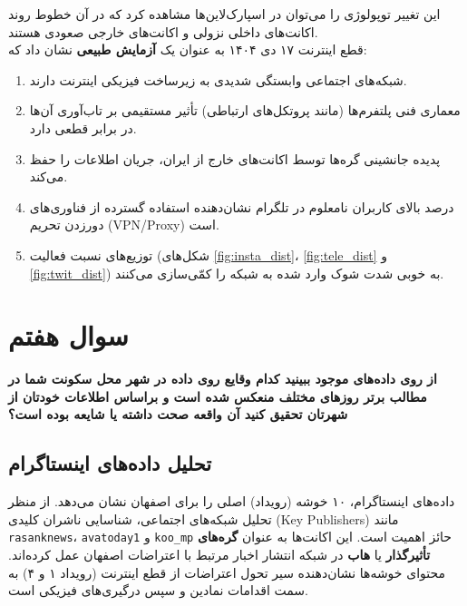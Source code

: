 \documentclass{article}
\begin{document}
		این تغییر توپولوژی را می‌توان در اسپارک‌لاین‌ها مشاهده کرد که در آن خطوط روند اکانت‌های داخلی نزولی و اکانت‌های خارجی صعودی هستند.
		\\
		قطع اینترنت ۱۷ دی ۱۴۰۴ به عنوان یک \textbf{آزمایش طبیعی} نشان داد که:
		\begin{enumerate}
			\item شبکه‌های اجتماعی وابستگی شدیدی به زیرساخت فیزیکی اینترنت دارند.
			\item معماری فنی پلتفرم‌ها (مانند پروتکل‌های ارتباطی) تأثیر مستقیمی بر تاب‌آوری آن‌ها در برابر قطعی دارد.
			\item پدیده جانشینی گره‌ها توسط اکانت‌های خارج از ایران، جریان اطلاعات را حفظ می‌کند.
			\item درصد بالای کاربران نامعلوم در تلگرام نشان‌دهنده استفاده گسترده از فناوری‌های دورزدن تحریم (VPN/Proxy) است.
			\item توزیع‌های نسبت فعالیت (شکل‌های \ref{fig:insta_dist}، \ref{fig:tele_dist} و \ref{fig:twit_dist}) به خوبی شدت شوک وارد شده به شبکه را کمّی‌سازی می‌کنند.
		\end{enumerate}


\FloatBarrier
\section{سوال هفتم}
\textbf{از روی داده‌های موجود ببینید کدام وقایع روی داده در شهر محل سکونت شما در مطالب برتر روزهای مختلف منعکس شده است و براساس اطلاعات خودتان از شهرتان تحقیق کنید آن واقعه صحت داشته یا شایعه بوده است؟}
\\
\subsection{تحلیل داده‌های اینستاگرام}
	داده‌های اینستاگرام، ۱۰ خوشه (رویداد) اصلی را برای اصفهان نشان می‌دهد. از منظر تحلیل شبکه‌های اجتماعی، شناسایی ناشران کلیدی (Key Publishers) مانند \texttt{rasanknews}، \texttt{avatoday1} و \texttt{koo\_mp} حائز اهمیت است. این اکانت‌ها به عنوان \textbf{گره‌های تأثیرگذار} یا \textbf{هاب} در شبکه انتشار اخبار مرتبط با اعتراضات اصفهان عمل کرده‌اند. محتوای خوشه‌ها نشان‌دهنده سیر تحول اعتراضات از قطع اینترنت (رویداد ۱ و ۴) به سمت اقدامات نمادین و سپس درگیری‌های فیزیکی است.
	
\end{document}
